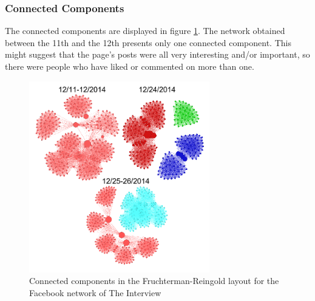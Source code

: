 \documentclass{llncs}
\begin{document}
\subsubsection{Connected Components}
The connected components are displayed in figure
\ref{fig:interview-facebook-cc}. The network obtained between the 11th and the
12th presents only one connected component. This might suggest that the page's
posts were all very interesting and/or important, so there were people who have
liked or commented on more than one.
%
\begin{figure}
\centering
\includegraphics[width=0.7\textwidth]{interview-facebook-cc.png}
\caption{Connected components in the Fruchterman-Reingold layout for the
    Facebook network of The Interview
\label{fig:interview-facebook-cc}}
\end{figure}
%
%
\end{document}
